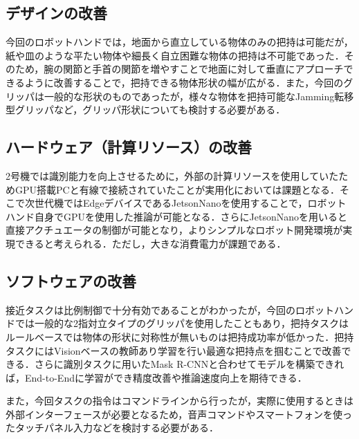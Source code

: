 \subsection*{デザインの改善}
今回のロボットハンドでは，地面から直立している物体のみの把持は可能だが，紙や皿のような平たい物体や細長く自立困難な物体の把持は不可能であった．そのため，腕の関節と手首の関節を増やすことで地面に対して垂直にアプローチできるように改善することで，把持できる物体形状の幅が広がる．また，今回のグリッパは一般的な形状のものであったが，様々な物体を把持可能なJamming転移型グリッパ\cite{jamminggripper}など，グリッパ形状についても検討する必要がある．

\subsection*{ハードウェア（計算リソース）の改善}
2号機では識別能力を向上させるために，外部の計算リソースを使用していたためGPU搭載PCと有線で接続されていたことが実用化においては課題となる．そこで次世代機ではEdgeデバイスであるJetsonNanoを使用することで，ロボットハンド自身でGPUを使用した推論が可能となる．さらにJetsonNanoを用いると直接アクチュエータの制御が可能となり，よりシンプルなロボット開発環境が実現できると考えられる．ただし，大きな消費電力が課題である．

\subsection*{ソフトウェアの改善}
接近タスクは比例制御で十分有効であることがわかったが，今回のロボットハンドでは一般的な2指対立タイプのグリッパを使用したこともあり，把持タスクはルールベースでは物体の形状に対称性が無いものは把持成功率が低かった．把持タスクにはVisionベースの教師あり学習を行い最適な把持点を掴むことで改善できる．さらに識別タスクに用いたMask R-CNNと合わせてモデルを構築できれば，End-to-Endに学習ができ精度改善や推論速度向上を期待できる．

また，今回タスクの指令はコマンドラインから行ったが，実際に使用するときは外部インターフェースが必要となるため，音声コマンドやスマートフォンを使ったタッチパネル入力などを検討する必要がある．
